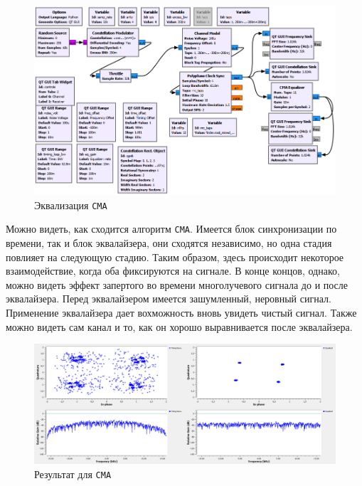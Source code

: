 \documentclass[a4paper]{article}
\begin{document}
            \begin{figure}[H]
                \centering
                \includegraphics[width=\textwidth]{img/p6_1.png}
                \caption{Эквализация \texttt{CMA}}
                \label{fig:p6_1}
            \end{figure}
            
            Можно видеть, как сходится алгоритм \texttt{CMA}. Имеется блок синхронизации по времени, так и блок эквалайзера, они сходятся независимо, но одна стадия повлияет на следующую стадию. Таким образом, здесь происходит некоторое взаимодействие, когда оба фиксируются на сигнале. В конце концов, однако, можно видеть эффект запертого во времени многолучевого сигнала до и после эквалайзера. Перед эквалайзером имеется зашумленный, неровный сигнал. Применение эквалайзера дает вохможность вновь увидеть чистый сигнал. Также можно видеть сам канал и то, как он хорошо выравнивается после эквалайзера.
            
            \begin{figure}[H]
                \centering
                \includegraphics[width=\textwidth]{img/p6_2.png}
                \caption{Результат для \texttt{CMA}}
                \label{fig:p6_2}
            \end{figure}
            
\end{document}
